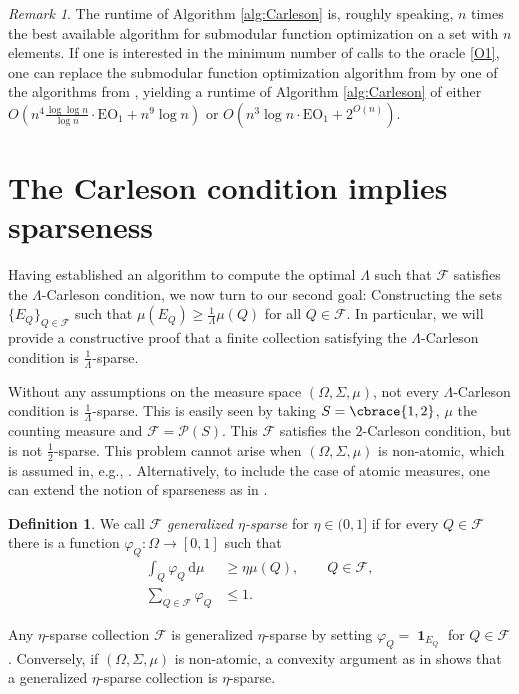\documentclass[a4paper, oneside,11pt]{amsart}
\theoremstyle{definition}
\newtheorem{definition}[theorem]{Definition}
\theoremstyle{remark}
\newtheorem{remark}[theorem]{Remark}
\numberwithin{equation}{section}
\newcommand{\mc}{\mathcal}
\DeclarePairedDelimiter\cbrace\{\}
\newcommand{\dd}{\hspace{2pt}\mathrm{d}}
\DeclareMathOperator{\ind}{\mathbf{1}}
\begin{document}
\begin{remark}
  The runtime of Algorithm \ref{alg:Carleson} is, roughly speaking, $n$ times the best available algorithm for submodular function optimization on a set with $n$ elements. If one is  interested in the minimum number of  calls to the oracle \ref{O1}, one can replace the submodular function optimization  algorithm from \cite{JLSZ24} by one of the algorithms from \cite{Ji22}, yielding a runtime of Algorithm \ref{alg:Carleson} of either $O(n^4 \frac{\log \log n}{\log n} \cdot \mathrm{EO}_1+ n^9 \log n)$ or $O(n^3 \log n \cdot \mathrm{EO}_1+ 2^{O(n)})$.
\end{remark}

\section{The Carleson condition implies sparseness}\label{sec:sparse}
Having established an algorithm to compute the optimal $\Lambda$ such that $\mc{F}$ satisfies the $\Lambda$-Carleson condition, we now turn to our second goal: Constructing the  sets $\{E_Q\}_{Q\in\mathcal{F}}$ such that $\mu(E_Q) \geq \frac{1}{\Lambda} \mu(Q)$ for all $Q \in \mc{F}$. In particular, we  will provide a constructive proof that a finite collection satisfying the $\Lambda$-Carleson condition is $\frac{1}{\Lambda}$-sparse.

Without any assumptions on the measure space $(\Omega,\Sigma,\mu)$, not every $\Lambda$-Carleson condition is $\frac{1}{\Lambda}$-sparse. This is easily seen by taking $S=\cbrace{1,2}$, $\mu$ the counting measure and $\mc{F} = \mc{P}(S)$. This $\mc{F}$ satisfies the $2$-Carleson condition,  but is not $\frac12$-sparse. This problem cannot arise when $(\Omega,\Sigma,\mu)$ is non-atomic, which is assumed in, e.g., \cite{Haen18,Ve96}. Alternatively, to include the case of atomic measures, one can extend the notion of sparseness as in \cite[Definition 1]{Re22}. 

\begin{definition}\label{def:gensparse}
  We call $\mc{F}$ \emph{generalized $\eta$-sparse} for $\eta \in (0,1]$ if for every $Q \in \mc{F}$ there is a function $\varphi_Q\colon \Omega \to [0,1]$ such that
\begin{align*}
  \int_Q \varphi_Q\dd \mu &\geq \eta \mu(Q),\qquad Q \in \mc{F},\\
  \sum_{Q \in \mc{F}}\varphi_Q &\leq 1.
\end{align*}
\end{definition}
Any $\eta$-sparse collection $\mc{F}$ is generalized $\eta$-sparse by setting $\varphi_Q = \ind_{E_Q}$ for $Q \in \mc{F}$. Conversely, if $(\Omega,\Sigma,\mu)$ is non-atomic, a convexity argument as in \cite[Lemma 2.3]{Do75} shows that a generalized $\eta$-sparse collection is $\eta$-sparse.
\end{document}
